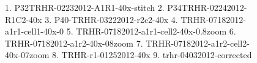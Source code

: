 \documentclass{article}
\begin{document}
\clearpage

\begin{figure}
  \centering
  \caption{1. P32TRHR-02232012-A1R1-40x-stitch
2. P34TRHR-02242012-R1C2-40x
3. P40-TRHR-03222012-r2c2-40x
4. TRHR-07182012-a1r1-cell1-40x-0
5. TRHR-07182012-a1r1-cell2-40x-0.8zoom
6. TRHR-07182012-a1r2-40x-08zoom
7. TRHR-07182012-a1r2-cell2-40x-07zoom
8. TRHR-r1-01252012-40x
9. trhr-04032012-corrected}
\end{figure}

\clearpage



\begin{figure}
  \centering
  \caption{}
\end{figure}

\clearpage
\end{document}
